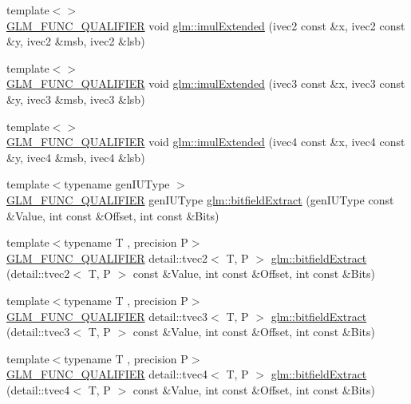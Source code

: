 \begin{DoxyCompactItemize}
\item 
{\footnotesize template$<$$>$ }\\\hyperlink{setup_8hpp_a33fdea6f91c5f834105f7415e2a64407}{G\+L\+M\+\_\+\+F\+U\+N\+C\+\_\+\+Q\+U\+A\+L\+I\+F\+I\+ER} void \hyperlink{namespaceglm_a9a2bbaf30c571f3851be2e0e60d856ca}{glm\+::imul\+Extended} (ivec2 const \&x, ivec2 const \&y, ivec2 \&msb, ivec2 \&lsb)
\item 
{\footnotesize template$<$$>$ }\\\hyperlink{setup_8hpp_a33fdea6f91c5f834105f7415e2a64407}{G\+L\+M\+\_\+\+F\+U\+N\+C\+\_\+\+Q\+U\+A\+L\+I\+F\+I\+ER} void \hyperlink{namespaceglm_ad7e696be671c1ff9cb6a7a3d2ef487f9}{glm\+::imul\+Extended} (ivec3 const \&x, ivec3 const \&y, ivec3 \&msb, ivec3 \&lsb)
\item 
{\footnotesize template$<$$>$ }\\\hyperlink{setup_8hpp_a33fdea6f91c5f834105f7415e2a64407}{G\+L\+M\+\_\+\+F\+U\+N\+C\+\_\+\+Q\+U\+A\+L\+I\+F\+I\+ER} void \hyperlink{namespaceglm_a8aa66966beaab138702abc4f469b9839}{glm\+::imul\+Extended} (ivec4 const \&x, ivec4 const \&y, ivec4 \&msb, ivec4 \&lsb)
\item 
{\footnotesize template$<$typename gen\+I\+U\+Type $>$ }\\\hyperlink{setup_8hpp_a33fdea6f91c5f834105f7415e2a64407}{G\+L\+M\+\_\+\+F\+U\+N\+C\+\_\+\+Q\+U\+A\+L\+I\+F\+I\+ER} gen\+I\+U\+Type \hyperlink{group__core__func__integer_ga251d309beb171bf95117d2c301b2ad8b}{glm\+::bitfield\+Extract} (gen\+I\+U\+Type const \&Value, int const \&Offset, int const \&Bits)
\item 
{\footnotesize template$<$typename T , precision P$>$ }\\\hyperlink{setup_8hpp_a33fdea6f91c5f834105f7415e2a64407}{G\+L\+M\+\_\+\+F\+U\+N\+C\+\_\+\+Q\+U\+A\+L\+I\+F\+I\+ER} detail\+::tvec2$<$ T, P $>$ \hyperlink{namespaceglm_ab80cbec6661f19566dafe4d23f997dee}{glm\+::bitfield\+Extract} (detail\+::tvec2$<$ T, P $>$ const \&Value, int const \&Offset, int const \&Bits)
\item 
{\footnotesize template$<$typename T , precision P$>$ }\\\hyperlink{setup_8hpp_a33fdea6f91c5f834105f7415e2a64407}{G\+L\+M\+\_\+\+F\+U\+N\+C\+\_\+\+Q\+U\+A\+L\+I\+F\+I\+ER} detail\+::tvec3$<$ T, P $>$ \hyperlink{namespaceglm_adcf06c42671bc9aeba477920df26c02e}{glm\+::bitfield\+Extract} (detail\+::tvec3$<$ T, P $>$ const \&Value, int const \&Offset, int const \&Bits)
\item 
{\footnotesize template$<$typename T , precision P$>$ }\\\hyperlink{setup_8hpp_a33fdea6f91c5f834105f7415e2a64407}{G\+L\+M\+\_\+\+F\+U\+N\+C\+\_\+\+Q\+U\+A\+L\+I\+F\+I\+ER} detail\+::tvec4$<$ T, P $>$ \hyperlink{namespaceglm_a7ac7cf2ac2cacd15c4dc19ef3e69fc07}{glm\+::bitfield\+Extract} (detail\+::tvec4$<$ T, P $>$ const \&Value, int const \&Offset, int const \&Bits)

\end{DoxyCompactItemize}
